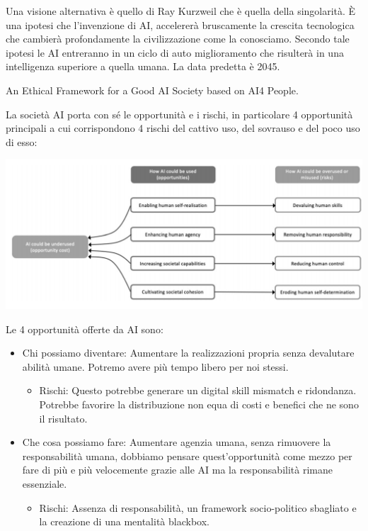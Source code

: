 \documentclass[a4page, 11pt]{article}
\begin{document}
Una visione alternativa è quello di Ray Kurzweil che è quella della
singolarità. È una ipotesi che l'invenzione di AI, accelererà
bruscamente la crescita tecnologica che cambierà profondamente la
civilizzazione come la conosciamo. Secondo tale ipotesi le AI entreranno
in un ciclo di auto miglioramento che risulterà in una intelligenza
superiore a quella umana. La data predetta è 2045.

An Ethical Framework for a Good AI Society based on AI4 People.

La società AI porta con sé le opportunità e i rischi, in particolare 4
opportunità principali a cui corrispondono 4 rischi del cattivo uso, del
sovrauso e del poco uso di esso:
\begin{center}
	\includegraphics[scale=0.4]{image3.png}
\end{center}


Le 4 opportunità offerte da AI sono:

\begin{itemize}
	\item
	Chi possiamo diventare: Aumentare la realizzazioni propria senza
	devalutare abilità umane. Potremo avere più tempo libero per noi
	stessi.
	
	\begin{itemize}
		 
		\item
		Rischi: Questo potrebbe generare un digital skill mismatch e
		ridondanza. Potrebbe favorire la distribuzione non equa di costi e
		benefici che ne sono il risultato. 
	\end{itemize}
	\item
	Che cosa possiamo fare: Aumentare agenzia umana, senza rimuovere la
	responsabilità umana, dobbiamo pensare quest'opportunità come mezzo
	per fare di più e più velocemente grazie alle AI ma la responsabilità
	rimane essenziale.
	
	\begin{itemize}
		 
		\item
		Rischi: Assenza di responsabilità, un framework socio-politico
		sbagliato e la creazione di una mentalità blackbox.
	\end{itemize}
\end{itemize}
\end{document}
